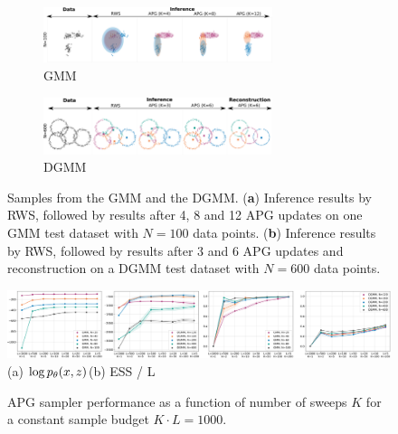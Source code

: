 \documentclass[anonymous=false, %
               format=acmsmall, %
               review=true, %
               screen=true, %
               nonacm=true]{acmart}
\theoremstyle{definition}
\begin{document}
\begin{figure}[t!]
  \centering
  \begin{subfigure}[t]{0.5\textwidth}
  \includegraphics[width=67mm]{figures/gmm_samples_1dataset.pdf}
  \vspace*{-1mm}
  \caption{GMM}
  \label{samples-gmm}
  \vspace{-1ex}
  \end{subfigure}%
  \begin{subfigure}[t]{0.5\textwidth}
  \includegraphics[width=67mm]{figures/dgmm_samples_1dataset.pdf}
  \vspace*{-1mm}
  \caption{DGMM}
  \label{samples-dgmm}
  \vspace{-1ex}
  \end{subfigure}
  \caption{Samples from the GMM and the DGMM. (\textbf{a}) Inference results by RWS, followed by results after 4, 8 and 12 APG updates on one GMM test dataset with $N=100$ data points. (\textbf{b}) Inference results by RWS, followed by results after 3 and 6 APG updates and reconstruction on a DGMM test dataset with $N=600$ data points.}
  \label{samples-mixture}
\end{figure}
\begin{figure}[t!]
  \centering
  \includegraphics[width=1.0\linewidth]{figures/both-budget-dot-v2.pdf}
  \vspace*{-3mm}
  {\small \hspace{1em}(a) $\log p_\theta(x, z)$\hspace{22em}(b) ESS / L}\\
  \caption{APG sampler performance as a function of number of sweeps $K$ for a constant sample budget $K \cdot L = 1000$.}
  \label{fig:budget}
\end{figure}
\end{document}
